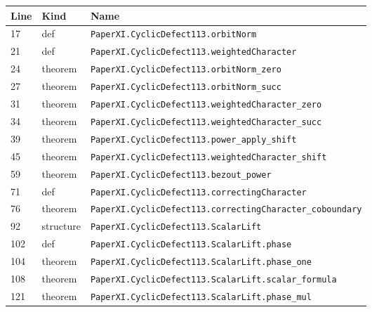 \documentclass[10pt,oneside]{book}
\begin{document}
\begin{longtable}{@{}p{}p{}p{}@{}}\toprule Line&Kind&Name\\\midrule\endhead

17&def&\nolinkurl{PaperXI.CyclicDefect113.orbitNorm}\\

21&def&\nolinkurl{PaperXI.CyclicDefect113.weightedCharacter}\\

24&theorem&\nolinkurl{PaperXI.CyclicDefect113.orbitNorm_zero}\\

27&theorem&\nolinkurl{PaperXI.CyclicDefect113.orbitNorm_succ}\\

31&theorem&\nolinkurl{PaperXI.CyclicDefect113.weightedCharacter_zero}\\

34&theorem&\nolinkurl{PaperXI.CyclicDefect113.weightedCharacter_succ}\\

39&theorem&\nolinkurl{PaperXI.CyclicDefect113.power_apply_shift}\\

45&theorem&\nolinkurl{PaperXI.CyclicDefect113.weightedCharacter_shift}\\

59&theorem&\nolinkurl{PaperXI.CyclicDefect113.bezout_power}\\

71&def&\nolinkurl{PaperXI.CyclicDefect113.correctingCharacter}\\

76&theorem&\nolinkurl{PaperXI.CyclicDefect113.correctingCharacter_coboundary}\\

92&structure&\nolinkurl{PaperXI.CyclicDefect113.ScalarLift}\\

102&def&\nolinkurl{PaperXI.CyclicDefect113.ScalarLift.phase}\\

104&theorem&\nolinkurl{PaperXI.CyclicDefect113.ScalarLift.phase_one}\\

108&theorem&\nolinkurl{PaperXI.CyclicDefect113.ScalarLift.scalar_formula}\\

121&theorem&\nolinkurl{PaperXI.CyclicDefect113.ScalarLift.phase_mul}\\


\end{longtable}
\end{document}
